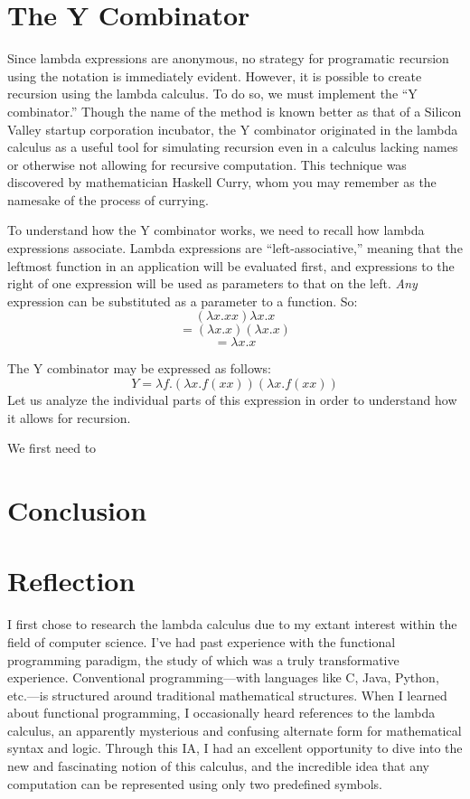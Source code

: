 \documentclass[twocolumn,titlepage,12pt]{article}
\begin{document}
\section{The Y Combinator}
Since lambda expressions are anonymous, no strategy for programatic recursion using the notation is immediately evident. However, it is possible to create recursion using the lambda calculus. To do so, we must implement the ``Y combinator.''\cite{ycombmedium} Though the name of the method is known better as that of a Silicon Valley startup corporation incubator, the Y combinator originated in the lambda calculus as a useful tool for simulating recursion even in a calculus lacking names or otherwise not allowing for recursive computation. This technique was discovered by mathematician Haskell Curry, whom you may remember as the namesake of the process of currying.

To understand how the Y combinator works, we need to recall how lambda expressions associate. Lambda expressions are ``left-associative,'' meaning that the leftmost function in an application will be evaluated first, and expressions to the right of one expression will be used as parameters to that on the left. \textit{Any} expression can be substituted as a parameter to a function. So:
$$(\lambda x.xx)\lambda x.x$$
$$=(\lambda x.x)(\lambda x.x)$$
$$=\lambda x.x$$

The Y combinator may be expressed as follows:
$$Y=\lambda f.(\lambda x.f(x x))(\lambda x.f(x x))$$
Let us analyze the individual parts of this expression in order to understand how it allows for recursion.

We first need to

\section{Conclusion}


\section{Reflection}
I first chose to research the lambda calculus due to my extant interest within the field of computer science. I've had past experience with the functional programming paradigm, the study of which was a truly transformative experience. Conventional programming---with languages like C, Java, Python, etc.---is structured around traditional mathematical structures. When I learned about functional programming, I occasionally heard references to the lambda calculus, an apparently mysterious and confusing alternate form for mathematical syntax and logic.
Through this IA, I had an excellent opportunity to dive into the new and fascinating notion of this calculus, and the incredible idea that any computation can be represented using only two predefined symbols.


\end{document}
